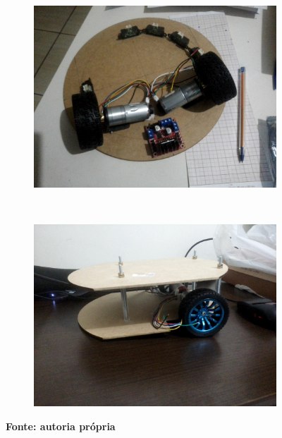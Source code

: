 \begin{figure}[h]
\centering
\caption{Materiais e robô após montagem}
\label{fig:RoboReal}
	\begin{subfigure}[b]{0.49\textwidth}%
		\centering
		\includegraphics[trim= 0cm 0cm 0cm 0cm,clip,
scale=0.07]{Figuras/Robo1}
	\end{subfigure}
	~
	\begin{subfigure}[b]{0.49\textwidth}%
		\centering
		\includegraphics[trim={0cm 0cm 0cm 0cm},clip,
scale=0.07]{Figuras/Robo2}
	\end{subfigure}
	
	\textbf{Fonte: autoria própria}
\end{figure}